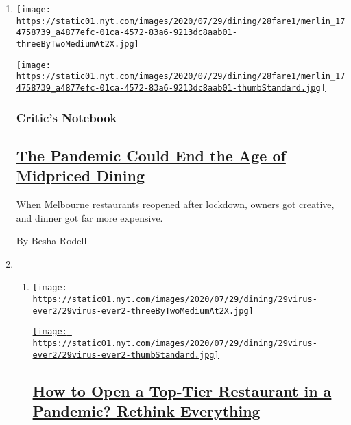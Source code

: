 \begin{enumerate}
\def\labelenumi{\arabic{enumi}.}
\item
  \texttt{[image: https://static01.nyt.com/images/2020/07/29/dining/28fare1/merlin\_174758739\_a4877efc-01ca-4572-83a6-9213dc8aab01-threeByTwoMediumAt2X.jpg]}

  \href{/2020/07/28/dining/melbourne-restaurants-coronavirus.html}{\texttt{[image: https://static01.nyt.com/images/2020/07/29/dining/28fare1/merlin\_174758739\_a4877efc-01ca-4572-83a6-9213dc8aab01-thumbStandard.jpg]}}

  \hypertarget{critics-notebook}{%
  \subsubsection{Critic's Notebook}\label{critics-notebook}}

  \hypertarget{the-pandemic-could-end-the-age-of-midpriced-dining}{%
  \subsection{\texorpdfstring{\href{/2020/07/28/dining/melbourne-restaurants-coronavirus.html}{The
  Pandemic Could End the Age of Midpriced
  Dining}}{The Pandemic Could End the Age of Midpriced Dining}}\label{the-pandemic-could-end-the-age-of-midpriced-dining}}

  When Melbourne restaurants reopened after lockdown, owners got
  creative, and dinner got far more expensive.

  By Besha Rodell
\item
  \begin{enumerate}
  \def\labelenumii{\arabic{enumii}.}
  \item
    \texttt{[image: https://static01.nyt.com/images/2020/07/29/dining/29virus-ever2/29virus-ever2-threeByTwoMediumAt2X.jpg]}

    \href{/2020/07/28/dining/ever-chicago-restaurant-coronavirus.html}{\texttt{[image: https://static01.nyt.com/images/2020/07/29/dining/29virus-ever2/29virus-ever2-thumbStandard.jpg]}}

    \hypertarget{how-to-open-a-top-tier-restaurant-in-a-pandemic-rethink-everything}{%
    \subsection{\texorpdfstring{\href{/2020/07/28/dining/ever-chicago-restaurant-coronavirus.html}{How
    to Open a Top-Tier Restaurant in a Pandemic? Rethink
    Everything}}{How to Open a Top-Tier Restaurant in a Pandemic? Rethink Everything}}\label{how-to-open-a-top-tier-restaurant-in-a-pandemic-rethink-everything}}


\end{enumerate}
\end{enumerate}
